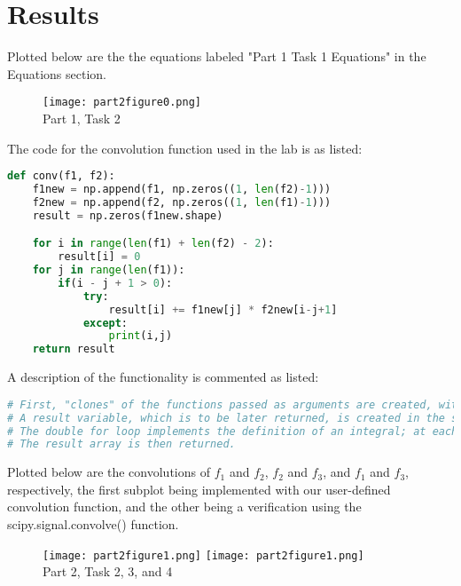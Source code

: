 \documentclass[11pt,a4]{article}
\begin{document}
\section{Results}
Plotted below are the the equations labeled "Part 1 Task 1 Equations" in the Equations section.
\begin{figure}[H]
	\centering
	\texttt{[image: part2figure0.png]}
	\\ Part 1, Task 2
\end{figure}

The code for the convolution function used in the lab is as listed:
\begin{lstlisting}[language=Python]
def conv(f1, f2):
    f1new = np.append(f1, np.zeros((1, len(f2)-1)))
    f2new = np.append(f2, np.zeros((1, len(f1)-1)))
    result = np.zeros(f1new.shape)

    for i in range(len(f1) + len(f2) - 2):
    	result[i] = 0
    for j in range(len(f1)):
    	if(i - j + 1 > 0):
    		try:
   				result[i] += f1new[j] * f2new[i-j+1]
    		except:
    			print(i,j)
	return result
\end{lstlisting}

A description of the functionality is commented as listed:
\begin{lstlisting}[language=Python]
# First, "clones" of the functions passed as arguments are created, with their lengths being extended by the length of the other. This is because the domain of a convolution combines that of its two input functions.
# A result variable, which is to be later returned, is created in the shape of one of the new function clones.
# The double for loop implements the definition of an integral; at each index i in the combined length of the two functions, the second function at a point i-j+1 is appended with the product of its value at that point and the value of all points preceding it from the first function. This supports the definition of a convolution defined as the output function being the "percent overlap" of the two input functions.
# The result array is then returned.
\end{lstlisting}

Plotted below are the convolutions of $f_1$ and $f_2$, $f_2$ and $f_3$, and $f_1$ and $f_3$, respectively, the first subplot being implemented with our user-defined convolution function, and the other being a verification using the scipy.signal.convolve() function.
\begin{figure}[H]
	\centering
	\texttt{[image: part2figure1.png]}
	\texttt{[image: part2figure1.png]}
	\\ Part 2, Task 2, 3, and 4
\end{figure}
\end{document}
